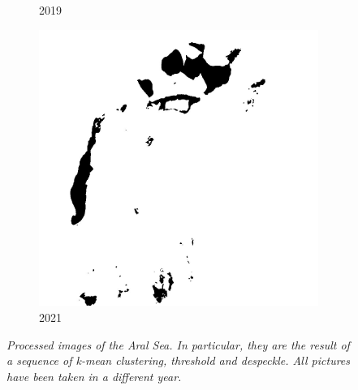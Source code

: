 \documentclass[12pt,a4paper]{article}
\begin{document}
\begin{figure}
\begin{subfigure}[b]{0.19\textwidth}
        \caption{2019}
    \end{subfigure}
    \begin{subfigure}[b]{0.19\textwidth}
        \centering
        \includegraphics[width=\textwidth]{../img/2021w.jpg}
        \caption{2021}
    \end{subfigure}
    \caption{\emph{Processed images of the Aral Sea.
            In particular, they are the result of a sequence of k-mean clustering, threshold and despeckle.
            All pictures have been taken in a different year.}}
    \label{fig:appendixsurface}
\end{figure}
\end{document}

